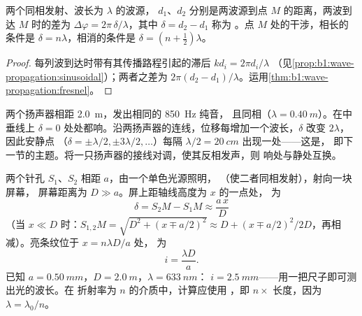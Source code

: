 \begin{proposition}\label{prop:b1:wave-propagation:pathdiff}
两个同相发射、波长为 $\lambda$ 的波源，
$d_1$、$d_2$ 分别是两波源到点 $M$ 的距离，两波到达 $M$ 时的差为
$\Delta\varphi = 2\pi\,\delta/\lambda$，其中 $\delta = d_2 - d_1$ 称为
\emph{}。点 $M$ 处的干涉，相长的条件是
$\delta = n\lambda$，相消的条件是 $\delta = (n + \tfrac12)\lambda$。
\end{proposition}

\begin{proof}
每列波到达时带有其传播路程引起的滞后 $kd_i = 2\pi d_i/\lambda$
（见\cref{prop:b1:wave-propagation:sinusoidal}）；两者之差为
$2\pi(d_2 - d_1)/\lambda$。运用\cref{thm:b1:wave-propagation:fresnel}。
\end{proof}

\begin{example}[两个扬声器]\label{ex:b1:wave-propagation:speakers}
两个扬声器相距 \qty{2.0}{m}，发出相同的 \qty{850}{Hz} 纯音，
且同相（$\lambda = \qty{0.40}{m}$）。在中垂线上
$\delta = 0$ 处处都响。沿两扬声器的连线，位移每增加一个波长，$\delta$
改变 $2\lambda$，因此安静点
（$\delta = \pm\lambda/2, \pm 3\lambda/2, \dots$）每隔
$\lambda/2 = \qty{20}{cm}$ 出现一处——这是，
即下一节的主题。将一只扬声器的接线对调，使其反相发声，则
响处与静处互换。
\end{example}

\begin{example}[杨氏双孔]\label{ex:b1:wave-propagation:young}
两个针孔 $S_1$、$S_2$ 相距 $a$，由一个单色光源照明，
（使二者同相发射），射向一块屏幕，
屏幕距离为 $D \gg a$。屏上距轴线高度为 $x$ 的一点处，
为
\[
\delta = S_2M - S_1M \approx \frac{a\,x}{D}
\]
（当 $x \ll D$ 时：$S_{1,2}M = \sqrt{D^2 + (x \mp a/2)^2} \approx D +
(x \mp a/2)^2/2D$，再相减）。亮条纹位于 $x = n\lambda D/a$ 处，
\emph{}为
\[
i = \frac{\lambda D}{a} .
\]
已知 $a = \qty{0.50}{mm}$，$D = \qty{2.0}{m}$，$\lambda = \qty{633}{nm}$：
$i = \qty{2.5}{mm}$——用一把尺子即可测出光的波长。在
折射率为 $n$ 的介质中，计算应使用
\emph{}，即 $n \times$ 长度，因为 $\lambda = \lambda_0/n$。
\end{example}


